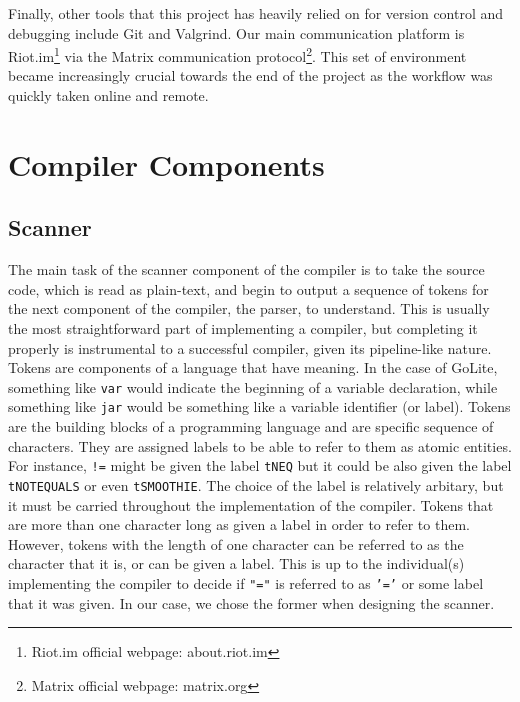 \documentclass{article}
\begin{document}
Finally, other tools that this project has heavily relied on for version control and debugging include Git and Valgrind. Our main communication platform is Riot.im\footnote{Riot.im official webpage: about.riot.im} via the Matrix communication protocol\footnote{Matrix official webpage: matrix.org}. This set of environment became increasingly crucial towards the end of the project as the workflow was quickly taken online and remote.


\section{Compiler Components}

\subsection{Scanner}

The main task of the scanner component of the compiler is to take the source code, which is read as plain-text, and begin to output a sequence of tokens for the next component of the compiler, the parser, to understand. This is usually the most straightforward part of implementing a compiler, but completing it properly is instrumental to a successful compiler, given its pipeline-like nature. Tokens are components of a language that have meaning. In the case of GoLite, something like \texttt{var} would indicate the beginning of a variable declaration, while something like \texttt{jar} would be something like a variable identifier (or label). Tokens are the building blocks of a programming language and are specific sequence of characters. They are assigned labels to be able to refer to them as atomic entities. For instance, \texttt{!=} might be given the label \texttt{tNEQ} but it could be also given the label \texttt{tNOTEQUALS} or even \texttt{tSMOOTHIE}. The choice of the label is relatively arbitary, but it must be carried throughout the implementation of the compiler. Tokens that are more than one character long as given a label in order to refer to them. However, tokens with the length of one character can be referred to as the character that it is, or can be given a label. This is up to the individual(s) implementing the compiler to decide if \texttt{"="} is referred to as \texttt{'='} or some label that it was given. In our case, we chose the former when designing the scanner.
\end{document}
